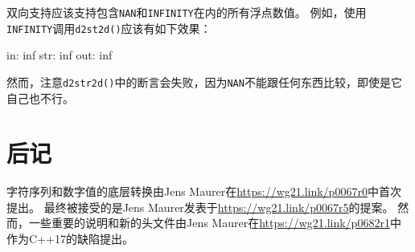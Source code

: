 双向支持应该支持包含\texttt{NAN}和\texttt{INFINITY}在内的所有浮点数值。
例如，使用\texttt{INFINITY}调用\texttt{d2st2d()}应该有如下效果：
\begin{blacklisting}
    in:  inf
    str: inf
    out: inf
\end{blacklisting}
然而，注意\texttt{d2str2d()}中的断言会失败，因为\texttt{NAN}不能跟任何东西比较，即使是它自己也不行。

\section{后记}
字符序列和数字值的底层转换由Jens Maurer在\url{https://wg21.link/p0067r0}中首次提出。
最终被接受的是Jens Maurer发表于\url{https://wg21.link/p0067r5}的提案。
然而，一些重要的说明和新的头文件由Jens Maurer在\url{https://wg21.link/p0682r1}中
作为C++17的缺陷提出。